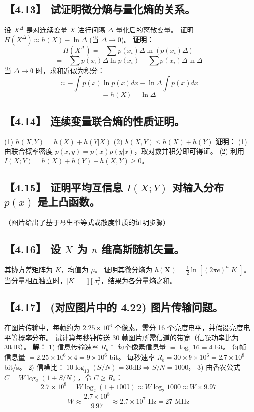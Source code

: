 \documentclass[11pt, a4paper]{article}
\begin{document}
\subsection*{【4.13】 试证明微分熵与量化熵的关系。}
设 $X^\Delta$ 是对连续变量 $X$ 进行间隔 $\Delta$ 量化后的离散变量。
证明 $H(X^\Delta) \approx h(X) - \ln \Delta$ (当 $\Delta \to 0$)。
\textbf{证明：}
\[ H(X^\Delta) = - \sum p(x_i)\Delta \ln (p(x_i)\Delta) \]
\[ = - \sum p(x_i)\Delta \ln p(x_i) - \sum p(x_i)\Delta \ln \Delta \]
当 $\Delta \to 0$ 时，求和近似为积分：
\[ \approx - \int p(x) \ln p(x) dx - \ln \Delta \int p(x) dx \]
\[ = h(X) - \ln \Delta \]

\subsection*{【4.14】 连续变量联合熵的性质证明。}
(1) $h(X, Y) = h(X) + h(Y|X)$
(2) $h(X, Y) \le h(X) + h(Y)$
\textbf{证明：}
(1) 由联合概率密度 $p(x,y) = p(x)p(y|x)$，取对数并积分即可得证。
(2) 利用 $I(X;Y) = h(X) + h(Y) - h(X,Y) \ge 0$。

\subsection*{【4.15】 证明平均互信息 $I(X;Y)$ 对输入分布 $p(x)$ 是上凸函数。}
（图片给出了基于琴生不等式或散度性质的证明步骤）

\subsection*{【4.16】 设 $X$ 为 $n$ 维高斯随机矢量。}
其协方差矩阵为 $K$，均值为 $\mu$。
证明其微分熵为 $h(\mathbf{X}) = \frac{1}{2} \ln [ (2\pi e)^n |K| ]$。
当分量相互独立时，$|K| = \prod \sigma_i^2$，结果为各分量熵之和。

\subsection*{【4.17】 (对应图片中的 4.22) 图片传输问题。}
在图片传输中，每帧约为 $2.25 \times 10^6$ 个像素，需分 16 个亮度电平，并假设亮度电平等概率分布。
试计算每秒钟传送 30 帧图片所需信道的带宽（信噪功率比为 30dB）。
\textbf{解：}
1) 信息传输速率 $R_b$：
每个像素信息量 $= \log_2 16 = 4$ bit。
每帧信息量 $= 2.25 \times 10^6 \times 4 = 9 \times 10^6$ bit。
每秒速率 $R_b = 30 \times 9 \times 10^6 = 2.7 \times 10^8$ bit/s。
2) 信噪比：
$10 \log_{10} (S/N) = 30 \text{dB} \Rightarrow S/N = 1000$。
3) 由香农公式 $C = W \log_2 (1 + S/N)$，令 $C \ge R_b$：
\[ 2.7 \times 10^8 = W \log_2 (1 + 1000) \approx W \log_2 1000 \approx W \times 9.97 \]
\[ W \approx \frac{2.7 \times 10^8}{9.97} \approx 2.7 \times 10^7 \text{ Hz} = 27 \text{ MHz} \]
\end{document}
